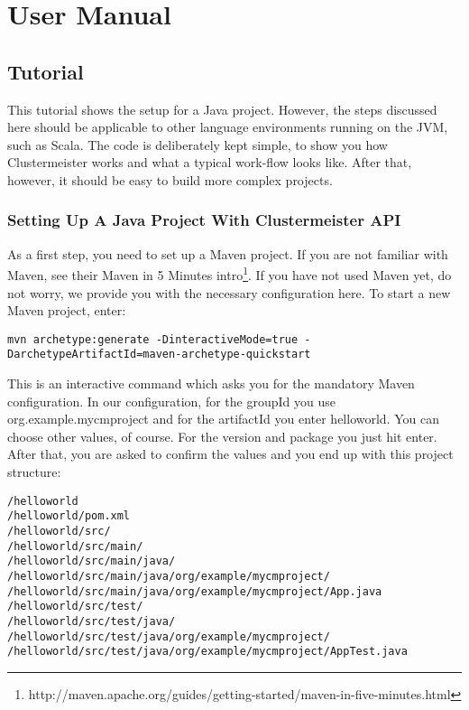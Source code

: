 \documentclass[english]{uzhpub}
\begin{document}
\section{User Manual}

\subsection{Tutorial}

This tutorial shows the setup for a Java project. However, the steps discussed here should be applicable to other language environments running on the JVM, such as Scala. The code is deliberately kept simple, to show you how Clustermeister works and what a typical work-flow looks like. After that, however, it should be easy to build more complex projects.

\subsubsection{Setting Up A Java Project With Clustermeister API}

As a first step, you need to set up a Maven project. If you are not familiar with Maven, see their Maven in 5 Minutes intro\footnote{http://maven.apache.org/guides/getting-started/maven-in-five-minutes.html}. 
If you have not used Maven yet, do not worry, we provide you with the necessary configuration here. To start a new Maven project, enter:

\begin{lstlisting}[breaklines=true]
 mvn archetype:generate -DinteractiveMode=true -DarchetypeArtifactId=maven-archetype-quickstart
\end{lstlisting}

This is an interactive command which asks you for the mandatory Maven configuration. In our configuration, for the groupId you use org.example.mycmproject and for the artifactId you enter helloworld. You can choose other values, of course. For the version and package you just hit enter. After that, you are asked to confirm the values and you end up with this project structure:

\begin{lstlisting}[breaklines=true]
/helloworld
/helloworld/pom.xml
/helloworld/src/
/helloworld/src/main/
/helloworld/src/main/java/
/helloworld/src/main/java/org/example/mycmproject/
/helloworld/src/main/java/org/example/mycmproject/App.java
/helloworld/src/test/
/helloworld/src/test/java/
/helloworld/src/test/java/org/example/mycmproject/
/helloworld/src/test/java/org/example/mycmproject/AppTest.java
\end{lstlisting}




\end{document}

